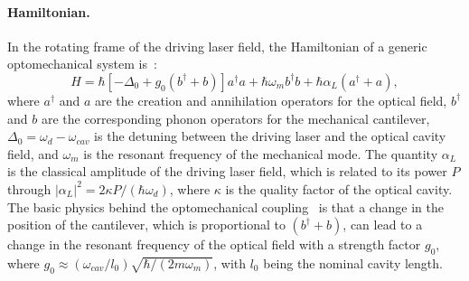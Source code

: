 \documentclass[12pt]{wlscirep}
\begin{document}
\paragraph*{Hamiltonian.}
In the rotating frame of the driving laser field, the Hamiltonian of a 
generic optomechanical system is~\cite{AKM:2014}:
\begin{equation} \label{eq:Hamiltonian}
H=\hbar[-\Delta_0+g_0(b^\dagger+b)]a^\dagger a+\hbar\omega_mb^\dagger b
+\hbar\alpha_L(a^\dagger+a),
\end{equation}
where $a^\dagger$ and $a$ are the creation and annihilation operators for
the optical field, $b^\dagger$ and $b$ are the corresponding phonon 
operators for the mechanical cantilever, $\Delta_0=\omega_{d}-\omega_{cav}$ 
is the detuning between the driving laser and the optical cavity field, and 
$\omega_m$ is the resonant frequency of the mechanical mode. The quantity
$\alpha_L$ is the classical amplitude of the driving laser field, which 
is related to its power $P$ through 
$|\alpha_L|^2=2\kappa P/(\hbar\omega_{d})$, where $\kappa$ is 
the quality factor of the optical cavity. The basic physics behind the 
optomechanical coupling~\cite{L:1995} is that a change in the position 
of the cantilever, which is proportional to $(b^\dagger+b)$, can lead to 
a change in the resonant frequency of the optical field with a strength 
factor $g_0$, where $g_0\approx (\omega_{cav}/l_0)\sqrt{\hbar/(2m\omega_m)}$,
with $l_0$ being the nominal cavity length. 
\end{document}
